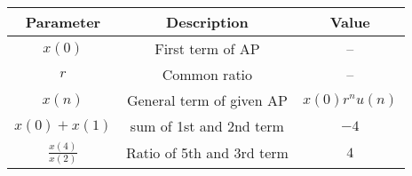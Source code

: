 \begin{tabular}{|c|c|c|}
      \hline
      Parameter & Description & Value\\\hline
      $x(0)$ & First term of AP & --\\\hline
      $r$ & Common ratio & --\\\hline
      $x(n)$ & General term of given AP & $x(0)r^nu(n)$\\\hline
      $x(0)+x(1)$ & sum of 1st and 2nd term & $-4$\\\hline
      $\displaystyle\frac{x(4)}{x(2)}$ & Ratio of 5th and 3rd term & $4$\\\hline
\end{tabular}

